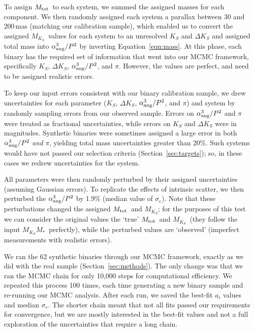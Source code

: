 \documentclass[twocolumn]{aastex62}
\newcommand{\mks}{$M_{K_S}$}
\newcommand{\mmk}{$M_{K_S}$\textendash$M_*$}
\newcommand{\mtot}{$M_{\rm{tot}}$}
\begin{document}
To assign \mtot\ to each system, we summed the assigned masses for each component. We then randomly assigned each system a parallax between 30 and 200\,mas (matching our calibration sample), which enabled us to convert the assigned \mks\ values for each system to an unresolved $K_S$ and $\Delta K_S$ and assigned total mass into $\alpha_{\rm{ang}}^3/P^2$ by inverting Equation~\ref{eqn:mass}. At this phase, each binary has the required set of information that went into our MCMC framework, specifically $K_S$, $\Delta K_S$, $\alpha_{\rm{ang}}^3/P^2$, and $\pi$. However, the values are perfect, and need to be assigned realistic errors. 

To keep our input errors consistent with our binary calibration sample, we drew uncertainties for each parameter ($K_S$, $\Delta K_S$, $\alpha_{\rm{ang}}^3/P^2$, and $\pi$) and system by randomly sampling errors from our observed sample. Errors on $\alpha_{\rm{ang}}^3/P^2$ and $\pi$ were treated as fractional uncertainties, while errors on $K_S$ and $\Delta K_S$ were in magnitudes. Synthetic binaries were sometimes assigned a large error in both $\alpha_{\rm{ang}}^3/P^2$ {\it and} $\pi$, yielding total mass uncertainties greater than 20\%. Such systems would have not passed our selection criteria (Section~\ref{sec:targets}); so, in these cases we redrew uncertainties for the system. 

All parameters were then randomly perturbed by their assigned uncertainties (assuming Gaussian errors). To replicate the effects of intrinsic scatter, we then perturbed the $\alpha_{\rm{ang}}^3/P^2$ by 1.9\% (median value of $\sigma_e$). Note that these perturbations changed the assigned \mtot\ and \mks; for the purposes of this test we can consider the original values the `true' \mtot\ and \mks\ (they follow the input \mmk\ perfectly), while the perturbed values are `observed' (imperfect measurements with realistic errors). 

We ran the 62 synthetic binaries through our MCMC framework, exactly as we did with the real sample (Section~\ref{sec:methods}). The only change was that we ran the MCMC chain for only 10,000 steps for computational efficiency. We repeated this process 100 times, each time generating a new binary sample and re-running our MCMC analysis. After each run, we saved the best-fit $a_i$ values and median $\sigma_e$. The shorter chain meant that not all fits passed our requirements for convergence, but we are mostly interested in the best-fit values and not a full exploration of the uncertainties that require a long chain. 
\end{document}
